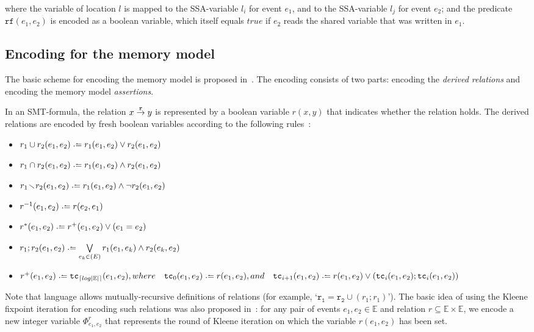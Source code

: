 where the variable of location $l$ is mapped to the SSA-variable $l_i$ for event $e_1$, and to the SSA-variable $l_j$ for event $e_2$; and the predicate $\mathtt{rf}(e_1, e_2)$ is encoded as a boolean variable, which itself equals $true$ if $e_2$ reads the shared variable that was written in $e_1$.


\subsection{Encoding for the memory model} %
\label{ch:port:enc:wmm}

The basic scheme for encoding the memory model is proposed in~\cite{Porthos17a}.
The encoding consists of two parts: encoding the \textit{derived relations} and encoding the memory model \textit{assertions}.

In an SMT-formula, the relation $x \overset{\mathtt{r}}{\rightarrow} y$ is represented by a boolean variable $r(x, y)$ that indicates whether the relation holds.
The derived relations are encoded by fresh boolean variables according to the following rules~\cite{Porthos17b}:
\begin{itemize}[noitemsep,topsep=0pt]
\item $r_1 \cup r_2(e_1, e_2) \defeq r_1(e_1, e_2) \lor r_2(e_1, e_2)$
\item $r_1 \cap r_2(e_1, e_2) \defeq r_1(e_1, e_2) \land r_2(e_1, e_2)$
\item $r_1 \relminus r_2(e_1, e_2) \defeq r_1(e_1, e_2) \land \neg r_2(e_1, e_2)$
\item $r^{-1}(e_1, e_2) \defeq r(e_2, e_1)$
\item $r^{*}(e_1, e_2) \defeq r^{+}(e_1, e_2) \lor (e_1 = e_2)$
\item $r_1;r_2(e_1,e_2) \defeq \bigvee\limits_{e_k \in \mathbb(E)}^{} r_1(e_1,e_k) \land r_2(e_k,e_2)$
\item $r^{+}(e_1, e_2) \defeq \mathtt{tc}_{\left\lceil log|\mathbb{E}| \right\rceil} (e_1, e_2), where \\
\hspace*{1em} \mathtt{tc}_{0}(e_1,e_2) \defeq r(e_1,e_2), and \\ 
\hspace*{1em} \mathtt{tc}_{i+1}(e_1,e_2) \defeq r(e_1,e_2) \lor (\mathtt{tc}_{i}(e_1,e_2);\mathtt{tc}_{i}(e_1,e_2))$
\end{itemize}

Note that \cat{} language allows mutually-recursive definitions of relations (for example, `$\mathtt{r_1} = \mathtt{r_2} \cup (r_1;r_1)$').
The basic idea of using the Kleene fixpoint iteration for encoding such relations was also proposed in~\cite{Porthos17a}: for any pair of events $e_1,e_2 \in \mathbb{E}$ and relation $r \subseteq \mathbb{E} \times \mathbb{E}$, we encode a new integer variable $\Phi_{e_1,e_2}^{r}$ that represents the round of Kleene iteration on which the variable $r(e_1, e_2)$ has been set.

